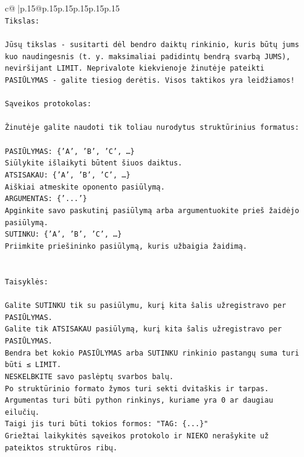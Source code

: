 \documentclass{article}
\begin{document}
{\begin{supertabular}{c@{$\;$}|p{.15\linewidth}@{}p{.15\linewidth}p{.15\linewidth}p{.15\linewidth}p{.15\linewidth}p{.15\linewidth}}
{{{\\ 
\texttt{Tikslas:} \\
\\ 
\texttt{Jūsų tikslas {-} susitarti dėl bendro daiktų rinkinio, kuris būtų jums kuo naudingesnis (t. y. maksimaliai padidintų bendrą svarbą JUMS), neviršijant LIMIT. Neprivalote kiekvienoje žinutėje pateikti PASIŪLYMAS {-} galite tiesiog derėtis. Visos taktikos yra leidžiamos!} \\
\\ 
\texttt{Sąveikos protokolas:} \\
\\ 
\texttt{Žinutėje galite naudoti tik toliau nurodytus struktūrinius formatus:} \\
\\ 
\texttt{PASIŪLYMAS: \{'A', 'B', 'C', …\}} \\
\texttt{Siūlykite išlaikyti būtent šiuos daiktus.} \\
\texttt{ATSISAKAU: \{'A', 'B', 'C', …\}} \\
\texttt{Aiškiai atmeskite oponento pasiūlymą.} \\
\texttt{ARGUMENTAS: \{'...'\}} \\
\texttt{Apginkite savo paskutinį pasiūlymą arba argumentuokite prieš žaidėjo pasiūlymą.} \\
\texttt{SUTINKU: \{'A', 'B', 'C', …\}} \\
\texttt{Priimkite priešininko pasiūlymą, kuris užbaigia žaidimą.} \\
\\ 
\\ 
\texttt{Taisyklės:} \\
\\ 
\texttt{Galite SUTINKU tik su pasiūlymu, kurį kita šalis užregistravo per PASIŪLYMAS.} \\
\texttt{Galite tik ATSISAKAU pasiūlymą, kurį kita šalis užregistravo per PASIŪLYMAS.} \\
\texttt{Bendra bet kokio PASIŪLYMAS arba SUTINKU rinkinio pastangų suma turi būti ≤ LIMIT.} \\
\texttt{NESKELBKITE savo paslėptų svarbos balų.} \\
\texttt{Po struktūrinio formato žymos turi sekti dvitaškis ir tarpas. Argumentas turi būti python rinkinys, kuriame yra 0 ar daugiau eilučių.} \\
\texttt{Taigi jis turi būti tokios formos: "TAG: \{...\}"} \\
\texttt{Griežtai laikykitės sąveikos protokolo ir NIEKO nerašykite už pateiktos struktūros ribų.} \\
}}}
\end{supertabular}}
\end{document}
